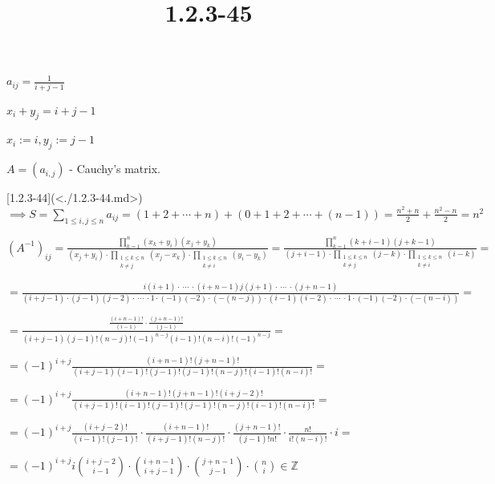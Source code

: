 \documentclass{article}
\title{1.2.3-45}
\begin{document}
\maketitle

\( a_{ij} = \frac{1}{i+j-1} \)

\( x_i + y_j = i + j - 1 \)

\( x_i := i, y_j := j - 1 \)

\( A = (a_{i,j}) \) - Cauchy's matrix.

[1.2.3-44](<./1.2.3-44.md>) \( \implies S = \sum_{1 \leq i,j \leq n} a_{ij} = (1 + 2 + \cdots + n) + (0 + 1 + 2 + \cdots + (n-1)) = \frac{n^2+n}{2} + \frac{n^2-n}{2} = n^2 \)

\( (A^{-1})_{ij} = \frac{\prod_{k=1}^n(x_k + y_i)(x_j+y_k)}{(x_j+y_i) \cdot \prod_{\substack{1 \leq k \leq n\\ k \neq j}} (x_j-x_k) \cdot \prod_{\substack{1 \leq k \leq n\\ k \neq i}} (y_i-y_k)} = \frac{\prod_{k=1}^n(k + i - 1)(j+k-1)}{(j+i-1) \cdot \prod_{\substack{1 \leq k \leq n\\ k \neq j}} (j-k) \cdot \prod_{\substack{1 \leq k \leq n\\ k \neq i}} (i-k)} = \)

\( = \frac{i(i+1) \cdot\ \cdots\ \cdot (i+n-1)j(j+1) \cdot\ \cdots\ \cdot (j+n-1)}{(i+j-1) \cdot (j-1)(j-2) \cdot\ \cdots\ \cdot 1 \cdot (-1)(-2)\cdot(-(n-j)) \cdot (i - 1)(i-2) \cdot\ \cdots\ \cdot 1 \cdot (-1)(-2)\cdot(-(n-i))} = \)

\( = \frac{\frac{(i+n-1)!}{(i-1)}\cdot \frac{(j+n-1)!}{(j-1)}}{(i+j-1)(j-1)!(n-j)! (-1)^{n-j}(i-1)!(n-i)! (-1)^{n-j}} = \)

\( = (-1)^{i+j} \frac{(i+n-1)!(j+n-1)!}{(i+j-1)(i-1)!(j-1)!(j-1)!(n-j)! (i-1)!(n-i)!} = \)

\( = (-1)^{i+j} \frac{(i+n-1)!(j+n-1)!(i+j-2)!}{(i+j-1)!(i-1)!(j-1)!(j-1)!(n-j)! (i-1)!(n-i)!} = \)

\( = (-1)^{i+j} \frac{(i+j-2)!}{(i-1)!(j-1)!} \cdot \frac{(i+n-1)!}{(i+j-1)!(n-j)!} \cdot \frac{(j+n-1)!}{(j-1)!n!} \cdot \frac{n!}{i!(n-i)!} \cdot i = \)

\( = (-1)^{i+j} i \binom{i+j-2}{i-1} \cdot \binom{i+n-1}{i+j-1} \cdot \binom{j+n-1}{j-1} \cdot \binom{n}{i} \in \mathbb{Z} \)
\end{document}
